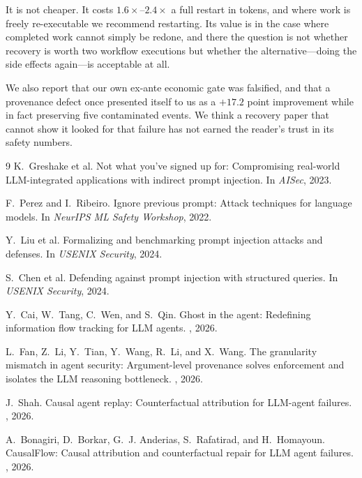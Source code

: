 \documentclass[10pt,twocolumn]{article}
\begin{document}
It is not cheaper. It costs $1.6\times$--$2.4\times$ a full restart in tokens,
and where work is freely re-executable we recommend restarting. Its value is
in the case where completed work cannot simply be redone, and there the
question is not whether recovery is worth two workflow executions but whether
the alternative---doing the side effects again---is acceptable at all.

We also report that our own ex-ante economic gate was falsified, and that a
provenance defect once presented itself to us as a $+17.2$ point improvement
while in fact preserving five contaminated events. We think a recovery paper
that cannot show it looked for that failure has not earned the reader's trust
in its safety numbers.

\begin{thebibliography}{9}
\small
{}
K.~Greshake et al.
\newblock Not what you've signed up for: Compromising real-world LLM-integrated
applications with indirect prompt injection.
\newblock In {\em AISec}, 2023.

F.~Perez and I.~Ribeiro.
\newblock Ignore previous prompt: Attack techniques for language models.
\newblock In {\em NeurIPS ML Safety Workshop}, 2022.

Y.~Liu et al.
\newblock Formalizing and benchmarking prompt injection attacks and defenses.
\newblock In {\em USENIX Security}, 2024.

S.~Chen et al.
\newblock Defending against prompt injection with structured queries.
\newblock In {\em USENIX Security}, 2024.

Y.~Cai, W.~Tang, C.~Wen, and S.~Qin.
\newblock Ghost in the agent: Redefining information flow tracking for LLM
agents.
, 2026.

L.~Fan, Z.~Li, Y.~Tian, Y.~Wang, R.~Li, and X.~Wang.
\newblock The granularity mismatch in agent security: Argument-level
provenance solves enforcement and isolates the LLM reasoning bottleneck.
, 2026.

J.~Shah.
\newblock Causal agent replay: Counterfactual attribution for LLM-agent
failures.
, 2026.

A.~Bonagiri, D.~Borkar, G.~J. Anderias, S.~Rafatirad, and H.~Homayoun.
\newblock CausalFlow: Causal attribution and counterfactual repair for LLM
agent failures.
, 2026.


\end{thebibliography}
\end{document}
